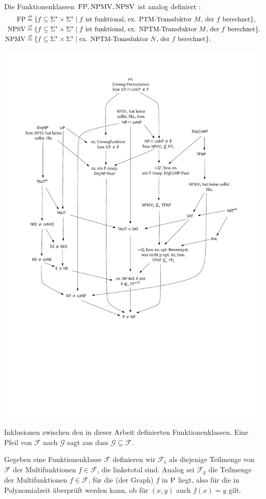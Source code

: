 Die Funktionenklassen $\FP, \mathrm{NPMV}, \mathrm{NPSV}$ ist analog definiert \parencite{selman_taxonomy_1994}:
\bgroup\setlength{\mathindent}{0pt}
\begin{align*}
    \FP &\defeq \{ f\subseteq \Sigma^*\times\Sigma^* \mid \text{$f$ ist funktional, ex. PTM-Transduktor $M$, der $f$ berechnet} \},\\
    \NPSV &\defeq \{ f\subseteq \Sigma^*\times\Sigma^* \mid \text{$f$ ist funktional, ex. NPTM-Transduktor $M$, der $f$ berechnet} \},\\
    \NPMV &\defeq \{ f\subseteq \Sigma^*\times\Sigma^* \mid \text{ex. NPTM-Transduktor $N$, der $f$ berechnet} \}.
\end{align*}\egroup
\begin{marginfigure}
    \centering\includegraphics[page=9]{figures.pdf}
    \caption{Inklusionen zwischen den in dieser Arbeit definierten Funktionenklassen. Eine Pfeil von $\mathcal F$ nach $\mathcal G$ sagt aus dass $\mathcal{G}\subseteq \mathcal F$.}\label{fig:functionclasses}
\end{marginfigure}
Gegeben eine Funktionenklasse $\mathcal F$ definieren wir $\mathcal F_\mathrm t$ als diejenige Teilmenge von $\mathcal F$ der Multifunktionen $f\in\mathcal F$, die linkstotal sind. 
Analog sei $\mathcal F_\mathrm g$ die Teilmenge der Multifunktionen $f\in\mathcal F$, für die (der Graph) $f$ in $\P$ liegt, also für die in Polynomialzeit überprüft werden kann, ob für $(x,y)$ auch $f(x)=y$ gilt.

